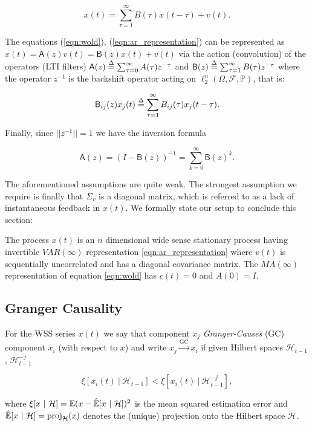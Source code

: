 \documentclass[12pt]{article}
\def\gc{\overset{\text{GC}}{\rightarrow}}  %
\def\B{\mathsf{B}}  %
\def\A{\mathsf{A}}  %
\def\H{\mathcal{H}}  %
\newcommand{\linE}[2]{\hat{\E}[#1\ |\ #2]}  %
\newcommand{\linEerr}[2]{\xi[#1\ |\ #2]}  %
\begin{document}
\begin{equation}
  \label{eqn:ar_representation}
  x(t) = \sum_{\tau = 1}^\infty B(\tau) x(t - \tau) + v(t).
\end{equation}

The equations (\ref{eqn:wold}), (\ref{eqn:ar_representation}) can be
represented as $x(t) = \A(z)v(t) = \B(z)x(t) + v(t)$ via the action
(convolution) of the operators (LTI filters)
$\A(z) \defeq \sum_{\tau = 0}^\infty A(\tau)z^{-\tau}$ and
$\B(z) \defeq \sum_{\tau = 1}^\infty B(\tau)z^{-\tau}$ where the
operator $z^{-1}$ is the backshift operator acting on
$\ell_2^n(\Omega, \mathcal{F}, \mathbb{P})$, that is:

\begin{equation}
  \label{eqn:filter_action}
  \B_{ij}(z)x_j(t) \defeq \sum_{\tau = 1}^\infty B_{ij}(\tau)x_j(t - \tau).
\end{equation}

Finally, since $||z^{-1}|| = 1$ we have the inversion formula

\begin{equation}
  \label{eqn:lsi_inversion}
  \A(z) = (I - \B(z))^{-1} = \sum_{k = 0}^\infty \B(z)^k.
\end{equation}

The aforementioned assumptions are quite weak.  The strongest
assumption we require is finally that $\Sigma_v$ is a diagonal matrix,
which is referred to as a lack of instantaneous feedback in $x(t)$.
We formally state our setup to conclude this section:

\begin{definition}
  The process $x(t)$ is an $n$ dimensional wide sense stationary
  process having invertible $VAR(\infty)$ representation
  \eqref{eqn:ar_representation} where $v(t)$ is sequentially
  uncorrelated and has a diagonal covariance matrix.  The $MA(\infty)$
  representation of equation \eqref{eqn:wold} has $c(t) = 0$ and
  $A(0) = I$.
\end{definition}


\subsection{Granger Causality}

\begin{definition}
  \label{def:granger_causality}
  For the WSS series $x(t)$ we say that component $x_j$
  \textit{Granger-Causes} (GC) component $x_i$ (with respect to $x$)
  and write $x_j \gc x_i$ if given Hilbert spaces
  $\H_{t - 1}$, $\H^{-j}_{t - 1}$

\begin{equation}
  \linEerr{x_i(t)}{\H_{t - 1}} < \linEerr{x_i(t)}{\H^{-j}_{t - 1}},
\end{equation}

where $\xi[x \ |\ \H] = \E (x - \linE{x}{\H})^2$ is the mean squared
estimation error and $\linE{x}{\H} = \text{proj}_{\H}(x)$ denotes the
(unique) projection onto the Hilbert space $\H$.
\end{definition}
\end{document}
